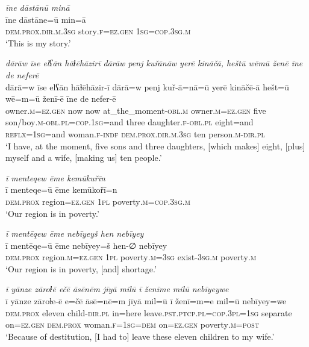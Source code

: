 \ea \label{ŽM.12}
\textit{īne dāstānū minā} \\ 
\gll īne dāstāne=ū min=ā \\ 
 \textsc{dem.prox}\textsc{.dir}\textsc{.m}\textsc{.3sg} story\textsc{.f}\textsc{=ez.gen} \textsc{1sg}\textsc{=cop}\textsc{.3sg}\textsc{.m} \\ 
\glt `This is my story.'
\z 
 
\ea \label{ŽM.16}
\textit{dārāw īse elʕān hāɫēhāzirī dārāw penj kuřānāw yerē kināčā, heštū wēmū ženē īne de neferē} \\ 
\gll dārā=w īse elʕān hāɫēhāzir-ī dārā=w penj kuř-ā=nā=ū yerē kināčē-ā hešt=ū wē=m=ū ženī-ē īne de nefer-ē \\ 
 owner\textsc{.m}\textsc{=ez.gen} now now at\_the\_moment\textsc{-obl}\textsc{.m} owner\textsc{.m}\textsc{=ez.gen} five son/boy\textsc{.m}\textsc{-obl}\textsc{.pl}\textsc{=cop}\textsc{.\textsc{1sg}}=and three daughter\textsc{.f}\textsc{-obl}\textsc{.pl} eight=and \textsc{reflx}\textsc{=\textsc{1sg}}=and woman\textsc{.f}\textsc{-indf} \textsc{dem.prox}\textsc{.dir}\textsc{.m}\textsc{.3sg} ten person\textsc{.m}\textsc{-dir}\textsc{.pl} \\ 
\glt `I have, at the moment, five sons and three daughters, [which makes] eight, [plus] myself and a wife, [making us] ten people.'
\z 
 
\ea \label{ŽM.19}
\textit{ī menteqew ēme kemūkuřīn} \\ 
\gll ī menteqe=ū ēme kemūkořī=n \\ 
 \textsc{dem.prox} region\textsc{=ez.gen} \textsc{1pl} poverty\textsc{.m}\textsc{=cop}\textsc{.3sg}\textsc{.m} \\ 
\glt `Our region is in poverty.'
\z 
 
\ea \label{ŽM.21}
\textit{ī mentēqew ēme nebīyeyš hen nebīyey} \\ 
\gll ī mentēqe=ū ēme nebīyey=š hen-∅ nebīyey \\ 
 \textsc{dem.prox} region\textsc{.m}\textsc{=ez.gen} \textsc{1pl} poverty\textsc{.m}\textsc{=3sg} exist\textsc{-3sg}\textsc{.m} poverty\textsc{.m} \\ 
\glt `Our region is in poverty, [and] shortage.'
\z 
 
\ea \label{ŽM.27}
\textit{ī yānze zāroɫē ečē āsēnēm jīyā milū ī ženīme milū nebīyeywe} \\ 
\gll ī yānze zāroɫe-ē e=čē āsē=nē=m jīyā mil=ū ī ženī=m=e mil=ū nebīyey=we \\ 
 \textsc{dem.prox} eleven child\textsc{-dir}\textsc{.pl} in=here leave\textsc{.pst}\textsc{.ptcp}\textsc{.pl}\textsc{=cop}\textsc{.3pl}\textsc{=\textsc{1sg}} separate on\textsc{=ez.gen} \textsc{dem.prox} woman\textsc{.f}\textsc{=\textsc{1sg}}\textsc{=dem} on\textsc{=ez.gen} poverty\textsc{.m}\textsc{=\textsc{post}} \\ 
\glt `Because of destitution, [I had to] leave these eleven children to my wife.'
\z 
 
